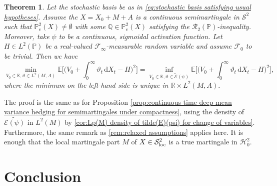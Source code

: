 \documentclass[11pt,a4paper,twoside,openany]{report}
\numberwithin{equation}{section}
\newcommand{\diff}{\mathrm{d}}
\theoremstyle{plain} %
\newtheorem{theorem}{Theorem}[section]
\theoremstyle{definition} %
\theoremstyle{remark} %
\begin{document}
\begin{theorem}\label{thm:continuous time deep mean variance hedging for semimartingales}
Let the stochastic basis be as in \eqref{eq:stochastic basis satisfying usual hypotheses}.
    Assume the \(X=X_0+M+A\) is a continuous semimartingale in \(\mathcal{S}^2\) such that  \(\mathbb{P}_e^2(X)\neq\emptyset\) with some \(\mathbb{Q}\in\mathbb{P}_e^2(X)\) satisfying the \(\mathcal{R}_2(\mathbb{P})\)-inequality. Moreover, take \(\psi\) to be a continuous, sigmoidal activation function. Let \(H\in L^2(\mathbb{P})\) be a real-valued \(\mathcal{F}_{\infty}\)-measurable random variable and assume \(\mathcal{F}_0\) to be trivial. Then we have
\begin{equation*}
    \min_{V_0\in\mathbb{R},\vartheta\in L^2(M,A)}\mathbb{E}\bigg[\bigg(V_0+\int_{0}^{\infty}\vartheta_t\,\diff X_t-H\bigg)^2\bigg]
    =\inf_{V_0\in\mathbb{R},\vartheta\in \widetilde{\mathcal{E}}(\psi)}
    \mathbb{E}\bigg[\bigg(V_0+\int_{0}^{\infty}\vartheta_t\,\diff X_t-H\bigg)^2\bigg],
\end{equation*}
where the minimum on the left-hand side is unique in \(\mathbb{R}\times L^2(M,A).\)
\end{theorem}
The proof is the same as for Proposition \ref{prop:continuous time deep mean variance hedging for semimartingales under compactness}, using the density of \(\widetilde{\mathcal{E}(\psi)}\) in \(L^2(M)\) by \ref{cor:Lp(M) density of tilde(E)(psi) for change of variables}.
Furthermore, the same remark as \cref{rem:relaxed assumptions} applies here. It is enough that the local martingale part \(M\) of \(X\in\mathcal{S}^2_{\rm{loc}}\) is a true martingale in \(\mathcal{H}_0^2\).





\chapter{Conclusion}
\end{document}
